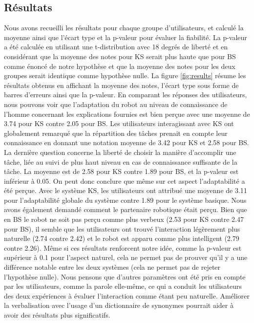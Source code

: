 \documentclass[a4paper,11pt,twoside]{StyleThese}
\begin{document}
\subsection{Résultats}

Nous avons recueilli les résultats pour chaque groupe d'utilisateurs, et calculé la moyenne ainsi que l'écart type et la p-valeur pour évaluer la fiabilité. La p-valeur a été calculée en utilisant une t-distribution avec 18 degrés de liberté et en considérant que la moyenne des notes pour KS serait plus haute que pour BS comme énoncé de notre hypothèse et que la moyenne des notes pour les deux groupes serait identique comme hypothèse nulle.
La figure \ref{fig:results} résume les résultats obtenus en affichant la moyenne des notes, l'écart type sous forme de barres d'erreurs ainsi que la p-valeur. En comparant les réponses des utilisateurs, nous pouvons voir que l'adaptation du robot au niveau de connaissance de l'homme concernant les explications fournies est bien perçue avec une moyenne de 3.74 pour KS contre 2.05 pour BS. Les utilisateurs interagissant avec KS ont globalement remarqué que la répartition des tâches prenait en compte leur connaissance en donnant une notation moyenne de 3.42 pour KS et 2.58 pour BS. La dernière question concerne la liberté de choisir la manière d'accomplir une tâche, liée au suivi de plus haut niveau en cas de connaissance suffisante de la tâche. La moyenne est de 2.58 pour KS contre 1.89 pour BS, et la p-valeur est inférieur à 0.05. On peut donc conclure que même sur cet aspect l'adaptabilité a été perçue.
Avec le système KS, les utilisateurs ont attribué une moyenne de 3.11 pour l'adaptabilité globale du système contre 1.89 pour le système basique.
Nous avons également demandé comment le partenaire robotique était perçu. Bien que en BS le robot ne soit pas perçu comme plus verbeux (2.53 pour KS contre 2.47 pour BS), il semble que les utilisateurs ont trouvé l'interaction légèrement plus naturelle (2.74 contre 2.42) et le robot est apparu comme plus intelligent (2.79 contre 2.26). Même si ces résultats renforcent notre idée, comme la p-valeur est supérieur à 0.1 pour l'aspect naturel, cela ne permet pas de prouver qu'il y a une différence notable entre les deux systèmes (cela ne permet pas de rejeter l'hypothèse nulle).
Nous pensons que d'autres paramètres ont été pris en compte par les utilisateurs, comme la parole elle-même, ce qui a conduit les utilisateurs des deux expériences à évaluer l'interaction comme étant peu naturelle. Améliorer la verbalisation avec l'usage d'un dictionnaire de synonymes pourrait aider à avoir des résultats plus significatifs.
\end{document}
